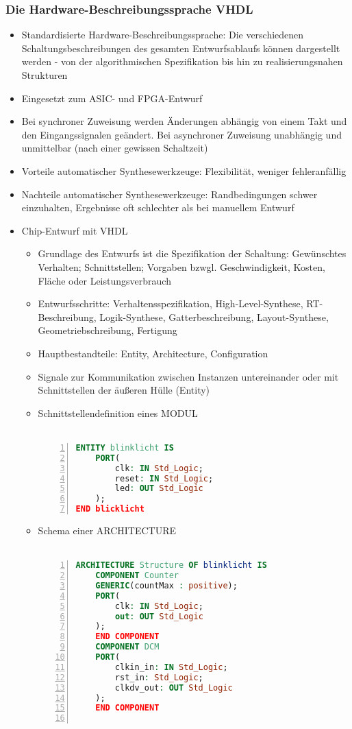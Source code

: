 \subsubsection{Die Hardware-Beschreibungssprache VHDL}
\begin{itemize}
	\item Standardisierte Hardware-Beschreibungssprache: Die verschiedenen Schaltungsbeschreibungen des gesamten Entwurfsablaufs können dargestellt werden - von der algorithmischen Spezifikation bis hin zu realisierungsnahen Strukturen
	\item Eingesetzt zum ASIC- und FPGA-Entwurf
	\item Bei synchroner Zuweisung werden Änderungen abhängig von einem Takt und den Eingangssignalen geändert. Bei asynchroner Zuweisung unabhängig und unmittelbar (nach einer gewissen Schaltzeit)
	\item Vorteile automatischer Synthesewerkzeuge: Flexibilität, weniger fehleranfällig
	\item Nachteile automatischer Synthesewerkzeuge: Randbedingungen schwer einzuhalten, Ergebnisse oft schlechter als bei manuellem Entwurf
	\item Chip-Entwurf mit VHDL
	\begin{itemize}
		\item Grundlage des Entwurfs ist die Spezifikation der Schaltung: Gewünschtes Verhalten; Schnittstellen; Vorgaben bzwgl. Geschwindigkeit, Kosten, Fläche oder Leistungsverbrauch
		\item Entwurfsschritte: Verhaltensspezifikation, High-Level-Synthese, RT-Beschreibung, Logik-Synthese, Gatterbeschreibung, Layout-Synthese, Geometriebschreibung, Fertigung
		\item Hauptbestandteile: Entity, Architecture, Configuration
		\item Signale zur Kommunikation zwischen Instanzen untereinander oder mit Schnittstellen der äußeren Hülle (Entity)
		\item Schnittstellendefinition eines MODUL\\\\
			\begin{minipage}{\linewidth}
			\begin{lstlisting}[frame=single,numbers=left,mathescape,language=VHDL,tabsize=4]
ENTITY blinklicht IS
	PORT(
		clk: IN Std_Logic;
		reset: IN Std_Logic;
		led: OUT Std_Logic
	);
END blicklicht
			\end{lstlisting}
			\end{minipage}
		\item Schema einer ARCHITECTURE\\\\
			\begin{minipage}{\linewidth}
			\begin{lstlisting}[frame=single,numbers=left,mathescape,language=VHDL,tabsize=4]
ARCHITECTURE Structure OF blinklicht IS
	COMPONENT Counter
	GENERIC(countMax : positive);
	PORT(
		clk: IN Std_Logic;
		out: OUT Std_Logic
	);
	END COMPONENT
	COMPONENT DCM
	PORT(
		clkin_in: IN Std_Logic;
		rst_in: Std_Logic;
		clkdv_out: OUT Std_Logic
	);
	END COMPONENT


\end{lstlisting}
\end{minipage}
\end{itemize}
\end{itemize}
